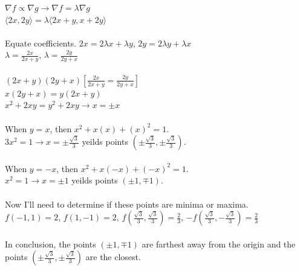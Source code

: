 \documentclass[12pt]{article}
\begin{document}
\noindent $\nabla f \propto \nabla g \rightarrow \nabla f = \lambda \nabla g$\\
\noindent $ \langle 2x,2y\rangle = \lambda \langle 2x+y, x+2y\rangle$\\\\
\noindent Equate coefficients. $2x = 2\lambda x +\lambda y$, \hspace{10pt} $2y = 2\lambda y + \lambda x$\\
\noindent $\lambda = \frac{2x}{2x+y}$, \hspace{10pt} $\lambda = \frac{2y}{2y+x}$\\\\
\noindent $(2x+y)(2y+x)[\frac{2x}{2x+y} = \frac{2y}{2y+x}]$\\
\noindent $x(2y+x) = y(2x+y)$\\
\noindent $x^{2} + 2xy  = y^{2}+ 2xy \rightarrow x = \pm x$\\\\
\noindent When $y = x$, then $x^{2} + x(x) + (x)^{2} = 1$.\\
\noindent $3x^{2} = 1 \rightarrow x = \pm \frac{\sqrt{3}}{3}$ yeilds points $(\pm \frac{\sqrt{3}}{3}, \pm \frac{\sqrt{3}}{3})$.\\\\
\noindent When $y =-x$, then $x^{2} + x(-x) + (-x)^{2} = 1$.\\
\noindent $x^{2} = 1 \rightarrow x = \pm 1$ yeilds points $(\pm 1, \mp 1)$.\\\\
\noindent Now I'll need to determine if these points are minima or maxima.\\
\noindent $f(-1, 1) = 2$, \hspace{10pt} $f(1, -1) = 2$, \hspace{10pt} $f(\frac{\sqrt{3}}{3}, \frac{\sqrt{3}}{3}) = \frac{2}{3}$, \hspace{10pt} $-f(\frac{\sqrt{3}}{3}, -\frac{\sqrt{3}}{3}) = \frac{2}{3}$\\\\
\noindent In conclusion, the points  $(\pm 1, \mp 1)$ are farthest away from the origin and the points $(\pm \frac{\sqrt{3}}{3}, \pm \frac{\sqrt{3}}{3})$ are the closest.\\\\\\
\end{document}
